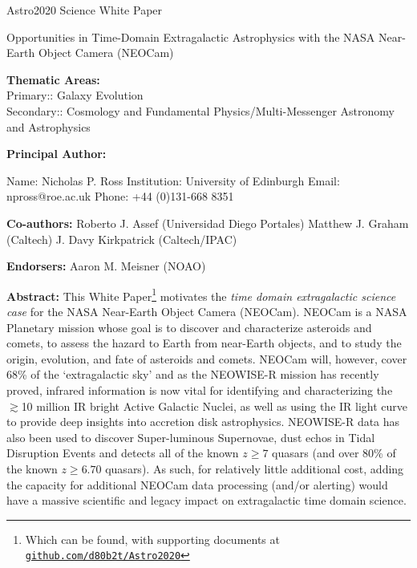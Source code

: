 \documentclass[12pt]{article}
\begin{document}
\raggedright
\huge
Astro2020 Science White Paper \linebreak

\textcolor{Cerulean}{Opportunities in Time-Domain Extragalactic Astrophysics with the NASA
Near-Earth Object Camera (NEOCam)}
\normalsize
\linebreak \linebreak 

\noindent \textbf{Thematic Areas:} \\
Primary:: Galaxy Evolution  \\
Secondary:: Cosmology and Fundamental Physics/Multi-Messenger Astronomy and Astrophysics 
\linebreak
  
\textbf{Principal Author:}

Name: Nicholas P. Ross	
 \linebreak						
Institution:  University of Edinburgh
 \linebreak
Email: npross@roe.ac.uk
 \linebreak
Phone:  +44 (0)131-668 8351
 \linebreak
 
\textbf{Co-authors:} %
  \linebreak
Roberto J. Assef (Universidad Diego Portales)   \linebreak
Matthew J. Graham (Caltech) \linebreak 
J. Davy Kirkpatrick (Caltech/IPAC) \linebreak


\textbf{Endorsers:} %
 \linebreak
Aaron M. Meisner (NOAO) 
\linebreak

\justify
\textbf{Abstract:}
This White
Paper\footnote{Which can be found, with supporting documents at \href{https://github.com/d80b2t/Astro2020}{{\tt github.com/d80b2t/Astro2020}}}
motivates the {\it time domain extragalactic science case} for the
NASA Near-Earth Object Camera (NEOCam). NEOCam is a NASA Planetary
mission whose goal is to discover and characterize asteroids and
comets, to assess the hazard to Earth from near-Earth objects, and to
study the origin, evolution, and fate of asteroids and comets. NEOCam
will, however, cover 68\% of the `extragalactic sky' and as the
NEOWISE-R mission has recently proved, infrared information is now
vital for identifying and characterizing the $\gtrsim$10 million IR
bright Active Galactic Nuclei, as well as using the IR light curve to
provide deep insights into accretion disk astrophysics. NEOWISE-R data
has also been used to discover Super-luminous Supernovae, dust echos
in Tidal Disruption Events and detects all of the known $z\geq7$
quasars (and over 80\% of the known $z\geq6.70$ quasars). As such, for
relatively little additional cost, adding the capacity for additional
NEOCam data processing (and/or alerting) would have a massive
scientific and legacy impact on extragalactic time domain science.
\end{document}
